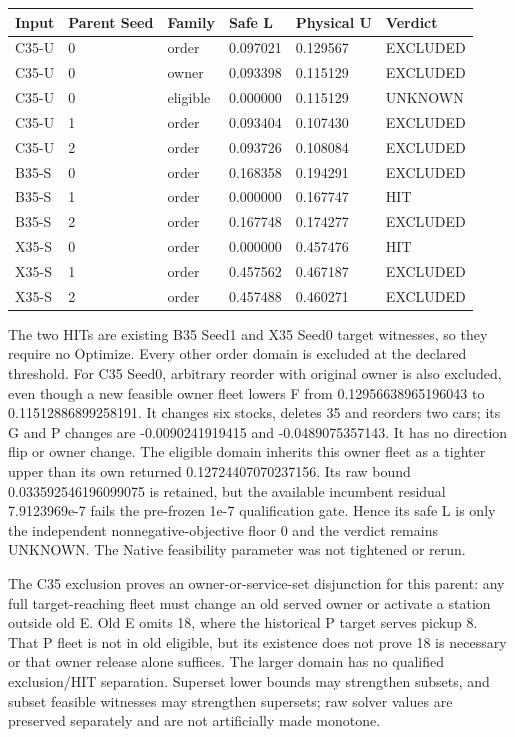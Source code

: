 \documentclass[
  american,
  11pt,
]{article}
\newcounter{none} %
\begin{document}
{\def\LTcaptype{none} %
\begin{longtable}[]{@{}llllll@{}}
\toprule\noalign{}
Input & Parent Seed & Family & Safe L & Physical U & Verdict \\
\midrule\noalign{}
\endhead
\bottomrule\noalign{}
\endlastfoot
C35-U & 0 & order & 0.097021 & 0.129567 & EXCLUDED \\
C35-U & 0 & owner & 0.093398 & 0.115129 & EXCLUDED \\
C35-U & 0 & eligible & 0.000000 & 0.115129 & UNKNOWN \\
C35-U & 1 & order & 0.093404 & 0.107430 & EXCLUDED \\
C35-U & 2 & order & 0.093726 & 0.108084 & EXCLUDED \\
B35-S & 0 & order & 0.168358 & 0.194291 & EXCLUDED \\
B35-S & 1 & order & 0.000000 & 0.167747 & HIT \\
B35-S & 2 & order & 0.167748 & 0.174277 & EXCLUDED \\
X35-S & 0 & order & 0.000000 & 0.457476 & HIT \\
X35-S & 1 & order & 0.457562 & 0.467187 & EXCLUDED \\
X35-S & 2 & order & 0.457488 & 0.460271 & EXCLUDED \\
\end{longtable}
}

The two HITs are existing B35 Seed1 and X35 Seed0 target witnesses, so
they require no Optimize. Every other order domain is excluded at the
declared threshold. For C35 Seed0, arbitrary reorder with original owner
is also excluded, even though a new feasible owner fleet lowers F from
0.12956638965196043 to 0.11512886899258191. It changes six stocks,
deletes 35 and reorders two cars; its G and P changes are
-0.0090241919415 and -0.0489075357143. It has no direction flip or owner
change. The eligible domain inherits this owner fleet as a tighter upper
than its own returned 0.12724407070237156. Its raw bound
0.033592546196099075 is retained, but the available incumbent residual
7.9123969e-7 fails the pre-frozen 1e-7 qualification gate. Hence its
safe L is only the independent nonnegative-objective floor 0 and the
verdict remains UNKNOWN. The Native feasibility parameter was not
tightened or rerun.

The C35 exclusion proves an owner-or-service-set disjunction for this
parent: any full target-reaching fleet must change an old served owner
or activate a station outside old E. Old E omits 18, where the
historical P target serves pickup 8. That P fleet is not in old
eligible, but its existence does not prove 18 is necessary or that owner
release alone suffices. The larger domain has no qualified exclusion/HIT
separation. Superset lower bounds may strengthen subsets, and subset
feasible witnesses may strengthen supersets; raw solver values are
preserved separately and are not artificially made monotone.
\end{document}
